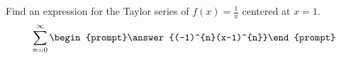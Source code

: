 \documentclass{ximera}
\author{Gregory Hartman \and Matthew Carr}
\begin{document}
\begin{exercise}






Find an expression for the Taylor series of $f(x)=\frac{1}{x}$ centered at $x=1$.
\[
\sum_{n=0}^{\infty}\begin{prompt}\answer{(-1)^{n}(x-1)^{n}}\end{prompt}
\]

\end{exercise}
\end{document}
